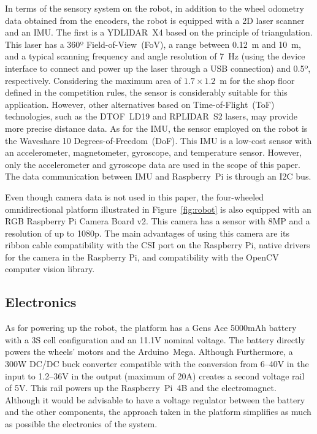 \documentclass[conference]{IEEEtran}
\begin{document}
In terms of the sensory system on the robot, in addition to the wheel odometry data obtained from the encoders, the robot is equipped with a 2D laser scanner and an IMU.
The first is a YDLIDAR~X4 based on the principle of triangulation.
This laser has a 360º Field-of-View~(FoV), a range between 0.12~m and 10~m, and a typical scanning frequency and angle resolution of 7~Hz (using the device interface to connect and power up the laser through a USB connection) and 0.5º, respectively.
Considering the maximum area of $1.7\times1.2$~m for the shop floor defined in the competition rules, the sensor is considerably suitable for this application.
However, other alternatives based on Time-of-Flight~(ToF) technologies, such as the DTOF~LD19 and RPLIDAR~S2 lasers, may provide more precise distance data.
As for the IMU, the sensor employed on the robot is the Waveshare 10 Degrees-of-Freedom~(DoF).
This IMU is a low-cost sensor with an accelerometer, magnetometer, gyroscope, and temperature sensor.
However, only the accelerometer and gyroscope data are used in the scope of this paper. The data communication between IMU and Raspberry~Pi is through an I2C bus.

Even though camera data is not used in this paper, the four-wheeled omnidirectional platform illustrated in Figure~\ref{fig:robot} is also equipped with an RGB Raspberry Pi Camera Board v2.
This camera has a sensor with 8MP and a resolution of up to 1080p.
The main advantages of using this camera are its ribbon cable compatibility with the CSI port on the Raspberry Pi, native drivers for the camera in the Raspberry Pi, and compatibility with the OpenCV computer vision library.



\subsection{Electronics}

As for powering up the robot, the platform has a Gens Ace 5000mAh battery with a 3S cell configuration and an 11.1V nominal voltage.
The battery directly powers the wheels' motors and the Arduino~Mega.
Although 
Furthermore, a 300W DC/DC buck converter compatible with the conversion from 6--40V in the input to 1.2--36V in the output (maximum of 20A) creates a second voltage rail of 5V.
This rail powers up the Raspberry~Pi~4B and the electromagnet.
Although it would be advisable to have a voltage regulator between the battery and the other components, the approach taken in the platform simplifies as much as possible the electronics of the system.
\end{document}
